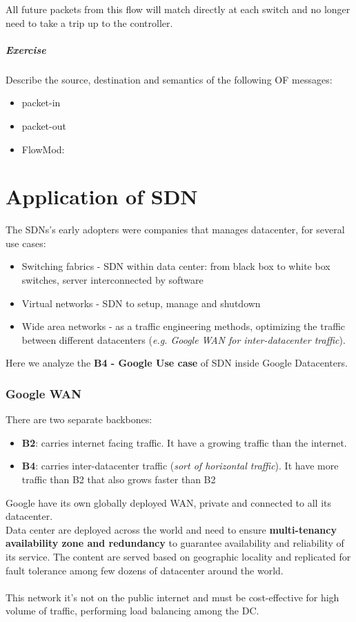 \documentclass[10pt,a4paper]{report}
\theoremstyle{definition}
\begin{document}
All future packets from this flow will match directly at each switch and no
longer need to take a trip up to the controller.
\subparagraph{Exercise}\label{sec:exercise}
Describe the source, destination and semantics of the following OF messages:
\begin{itemize}
	\item 
	packet-in
	\item 
	packet-out
	\item 
	FlowMod:
\end{itemize}
\section{Application of SDN}\label{sec:application-of-sdn}
The SDNs's early adopters were companies that manages datacenter, for several use cases:
\begin{itemize}
	\item 
	Switching fabrics - SDN within data center: from black box to white box switches, server interconnected by software
	\item 
	Virtual networks - SDN to setup, manage and shutdown
	\item 
	Wide area networks - as a traffic engineering methods, optimizing the traffic between different datacenters (\textit{e.g. Google WAN for inter-datacenter traffic}).
\end{itemize}

Here we analyze the \textbf{B4 - Google Use case} of SDN inside Google Datacenters.
\subsubsection{Google WAN}\label{sec:google-wan}
There are two separate backbones:
\begin{itemize}
	\item 
	\textbf{B2}: carries internet facing traffic. It have a growing traffic than the internet.
	\item 
	\textbf{B4}: carries inter-datacenter traffic (\textit{sort of horizontal traffic}). It have more traffic than B2 that also grows faster than B2

	

\end{itemize}
Google have its own globally deployed WAN, private and connected to all its datacenter.\\
Data center are deployed across the world and need to ensure \textbf{multi-tenancy availability zone and redundancy} to guarantee availability and reliability of its service. The content are served based on geographic locality and replicated for fault tolerance among few dozens of datacenter around the world.\\\\
This network it's not on the public internet and must be cost-effective for high volume of traffic, performing load balancing among the DC.
\end{document}

